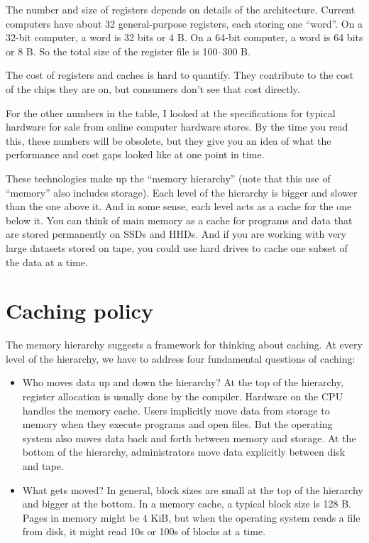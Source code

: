 \documentclass[12pt]{book}
\begin{document}
{The number and size of registers depends on details of the
architecture.  Current computers have about 32 general-purpose
registers, each storing one ``word''.  On a 32-bit computer, a word
is 32 bits or 4 B.  On a 64-bit computer, a word is 64 bits or 8 B.
So the total size of the register file is 100--300 B.

The cost of registers and caches is hard to quantify.  They contribute
to the cost of the chips they are on, but consumers don't see that
cost directly.

For the other numbers in the table, I looked at the specifications for
typical hardware for sale from online computer hardware stores.  By
the time you read this, these numbers will be obsolete, but they give
you an idea of what the performance and cost gaps looked like at one
point in time.

These technologies make up the ``memory hierarchy'' (note that this
use of ``memory'' also includes storage).  Each
level of the hierarchy is bigger and slower than the one above it.
And in some sense, each level acts as a cache for the one below
it.  You can think of main memory as a cache for programs and data
that are stored permanently on SSDs and HHDs.  And if you are working
with very large datasets stored on tape, you could use hard drives
to cache one subset of the data at a time.


\section{Caching policy}

The memory hierarchy suggests a framework for thinking about
caching.  At every level of the hierarchy, we have to address
four fundamental questions of caching:

\begin{itemize}

\item Who moves data up and down the hierarchy?  At the top of the
  hierarchy, register allocation is usually done by the compiler.
  Hardware on the CPU handles the memory cache.  Users implicitly move
  data from storage to memory when they execute programs and open
  files.  But the operating system also moves data back and forth
  between memory and storage.  At the bottom of the hierarchy,
  administrators move data explicitly between disk and tape.

\item What gets moved?  In general, block sizes are small at the top
  of the hierarchy and bigger at the bottom.  In a memory cache, a
  typical block size is 128 B.  Pages in memory might be 4 KiB, but
  when the operating system reads a file from disk, it might read 10s
  or 100s of blocks at a time.


\end{itemize}}
\end{document}
